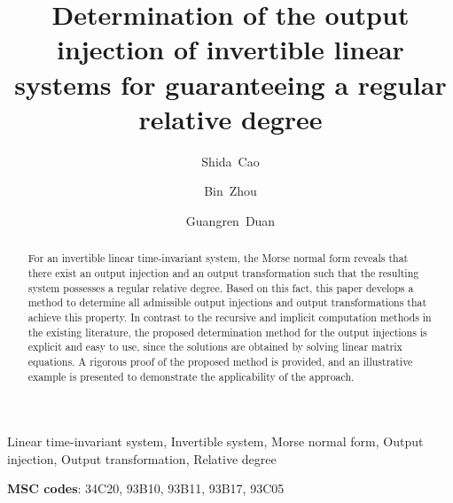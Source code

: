 \documentclass[sort&compress]{elsarticle}
\begin{document}
\begin{frontmatter}

\title{Determination of the output injection of
  invertible linear systems
  for guaranteeing a regular relative degree}%

\tnotetext[ack]{ }

\author[hit]{Shida~Cao}

\author[hit,keylab]{Bin~Zhou}

\author[hit,sust]{Guangren~Duan}




\begin{abstract}
For an invertible linear time-invariant system, the Morse normal form reveals that
there exist an output injection and an output transformation such that the resulting
system possesses a regular relative degree.
Based on this fact, this paper develops a method to determine all admissible output
injections and output transformations that achieve this property.
In contrast to the recursive and implicit computation methods in the existing
literature, the proposed determination method for the output injections is explicit
and easy to use, since the solutions are obtained by solving linear matrix equations.
A rigorous proof of the proposed method is provided, and an illustrative example is
presented to demonstrate the applicability of the approach.
\end{abstract}

\begin{keyword}
Linear time-invariant system\sep
Invertible system\sep
Morse normal form\sep
Output injection\sep
Output transformation\sep
Relative degree

\textbf{MSC codes}:
34C20\sep
93B10\sep
93B11\sep
93B17\sep
93C05
\end{keyword}



\end{frontmatter}
\end{document}
